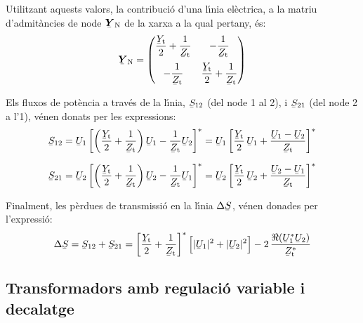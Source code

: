 Utilitzant aquests valors, la contribuci\'{o} d'una l\'{\i}nia el\`{e}ctrica, a
la matriu d'admit\`{a}ncies de node $\mcmplx{Y}\ped{N}$ de la xarxa a la
qual pertany, \'{e}s:  
\begin{equation}
   \mcmplx{Y}\ped{N} = \begin{pmatrix}
     \dfrac{\cmplx{Y}\ped{t}}{2} + \dfrac{1}{\cmplx{Z}\ped{t}} & -\dfrac{1}{\cmplx{Z}\ped{t}}\\[2.5ex]
     -\dfrac{1}{\cmplx{Z}\ped{t}} & \dfrac{\cmplx{Y}\ped{t}}{2} + \dfrac{1}{\cmplx{Z}\ped{t}}
   \end{pmatrix}
\end{equation}

Els fluxos de pot\`{e}ncia a trav\'{e}s de la l\'{\i}nia, $\cmplx{S}_{12}$ (del
node 1 al 2), i $\cmplx{S}_{21}$ (del node 2 a l'1), v\'{e}nen donats
per les expressions:
\begin{align}
   \cmplx{S}_{12} &= \cmplx{U}_1 \left[ \left( \frac{\cmplx{Y}\ped{t}}{2} + \frac{1}{\cmplx{Z}\ped{t}} \right) \cmplx{U}_1 - \frac{1}{\cmplx{Z}\ped{t}} \cmplx{U}_2 \right]^* = \cmplx{U}_1 \left[ \frac{\cmplx{Y}\ped{t}}{2}\, \cmplx{U}_1 + \frac{\cmplx{U}_1 - \cmplx{U}_2}{\cmplx{Z}\ped{t}} \right]^* \label{eq:lin_s12}
   \\[1.5ex]
   \cmplx{S}_{21} &= \cmplx{U}_2 \left[ \left( \frac{\cmplx{Y}\ped{t}}{2} + \frac{1}{\cmplx{Z}\ped{t}} \right) \cmplx{U}_2 - \frac{1}{\cmplx{Z}\ped{t}} \cmplx{U}_1 \right]^* = \cmplx{U}_2 \left[ \frac{\cmplx{Y}\ped{t}}{2} \,\cmplx{U}_2 + \frac{\cmplx{U}_2 - \cmplx{U}_1}{\cmplx{Z}\ped{t}} \right]^* \label{eq:lin_s21}
\end{align}

Finalment, les p\`{e}rdues de transmissi\'{o} en la  l\'{\i}nia
$\Delta\cmplx{S}$, v\'{e}nen donades per l'expressi\'{o}:
\begin{equation}
   \Delta\cmplx{S} = \cmplx{S}_{12} + \cmplx{S}_{21} = \left[ \frac{\cmplx{Y}\ped{t}}{2} + \frac{1}{\cmplx{Z}\ped{t}} \right]^* \Big[ |\cmplx{U}_1|^2 + |\cmplx{U}_2|^2 \Big] - 2 \, \frac{\Re (\cmplx{U}_1^* \cmplx{U}_2)}{\cmplx{Z}\ped{t}^*}
\end{equation}

\subsection{Transformadors amb regulaci\'{o} variable i decalatge}

